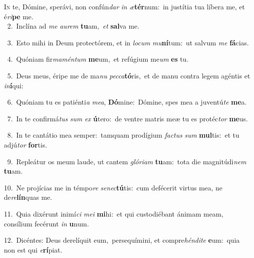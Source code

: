 \lettrine{\initial\textcolor{\initialcolor}{I}}{n} te, Dómine, sperávi, non confún\textit{dar} \textit{in} \textit{æ}\-\textbf{tér}num:~\star in justítia tua líbera me, et é\-\textit{ri}\-\textbf{pe} me.\\
{\numbfont\textcolor{\numbcolor}{~2.}}~Inclína ad \textit{me} \textit{au}\-\textit{rem} \textbf{tu}\-am,~\star \textit{et} \textbf{sal}\-va me.\par
{\numbfont\textcolor{\numbcolor}{~3.}}~Esto mihi in Deum protectórem, et in \textit{lo}\-\textit{cum} \textit{mu}\-\textbf{ní}tum:~\star ut salvum \textit{me} \textbf{fá}\-cias.\par
{\numbfont\textcolor{\numbcolor}{~4.}}~Quóniam fir\-\textit{ma}\-\textit{mén}\textit{tum} \textbf{me}\-um,~\star et refúgium me\textit{um} \textbf{es} tu.\par
{\numbfont\textcolor{\numbcolor}{~5.}}~Deus meus, éripe me de ma\textit{nu} \textit{pec}\-\textit{ca}\textbf{tó}ris,~\star et de manu contra legem agéntis et \textit{in}\-\textbf{í}qui:\par
{\numbfont\textcolor{\numbcolor}{~6.}}~Quóniam tu es patiénti\textit{a} \textit{me}\-\textit{a}, \textbf{Dó}\-mine:~\star Dómine, spes mea a juventú\textit{te} \textbf{me}\-a.\par
{\numbfont\textcolor{\numbcolor}{~7.}}~In te confirmá\textit{tus} \textit{sum} \textit{ex} \textbf{ú}\-tero:~\star de ventre matris meæ tu es protéc\textit{tor} \textbf{me}\-us.\par
{\numbfont\textcolor{\numbcolor}{~8.}}~In te cantátio mea semper:~\dagger tamquam prodígium \textit{fac}\-\textit{tus} \textit{sum} \textbf{mul}\-tis:~\star et tu adjú\textit{tor} \textbf{for}\-tis.\par
{\numbfont\textcolor{\numbcolor}{~9.}}~Repleátur os meum laude, ut cantem \textit{gló}\-\textit{ri}\textit{am} \textbf{tu}\-am:~\star tota die magnitúdi\textit{nem} \textbf{tu}\-am.\par
{\numbfont\textcolor{\numbcolor}{10.}}~Ne projícias me in témpo\textit{re} \textit{se}\-\textit{nec}\textbf{tú}tis:~\star cum defécerit virtus mea, ne de\-\textit{re}\-\textbf{lín}quas me.\par
{\numbfont\textcolor{\numbcolor}{11.}}~Quia dixérunt inimí\textit{ci} \textit{me}\-\textit{i} \textbf{mi}\-hi:~\star et qui custodiébant ánimam meam, consílium fecérunt \textit{in} \textbf{u}\-num.\par
{\numbfont\textcolor{\numbcolor}{12.}}~Dicéntes: Deus derelíquit eum,~\dagger persequímini, et compre\-\textit{hén}\-\textit{di}\textit{te} \textbf{e}\-um:~\star quia non est qui \textit{e}\-\textbf{rí}piat.\par
